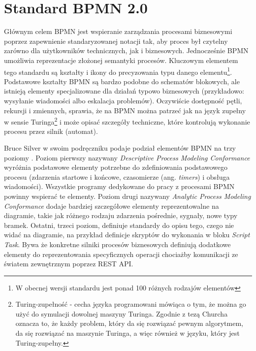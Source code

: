 \documentclass[declaration,shortabstract,mgr]{iithesis}
\newcommand{\bpmn}{BPMN }
\begin{document}
\chapter{Standard BPMN 2.0}\label{chapter-bpmn}
Głównym celem \bpmn jest wspieranie zarządzania procesami biznesowymi poprzez zapewnienie standaryzowanej notacji tak, aby proces był czytelny zarówno dla użytkowników technicznych, jak i biznesowych. Jednocześnie \bpmn umożliwia reprezentacje złożonej semantyki procesów. Kluczowym elementem tego standardu są kształty i ikony do precyzowania typu danego elementu\footnote{W obecnej wersji
standardu jest ponad 100 różnych rodzajów elementów}. Podstawowe kształty \bpmn są bardzo podobne do schematów blokowych, ale istnieją elementy specjalizowane dla działań typowo biznesowych (przykładowo: wysyłanie wiadomości albo eskalacja problemów). Oczywiście
dostępność pętli, rekursji i zmiennych, sprawia, że na \bpmn 
można patrzeć jak na język zupełny w sensie Turinga\footnote{Turing-zupełność - cecha języka programowani mówiąca o tym, że można go użyć do symulacji dowolnej maszyny Turinga. Zgodnie z tezą Churcha oznacza to, że każdy problem, który da się rozwiązać pewnym algorytmem, da się rozwiązać na maszynie Turinga, a więc również w języku, który jest Turing-zupełny.} i może opisać szczegóły techniczne, które kontrolują wykonanie procesu przez silnik (automat).  

Bruce Silver w swoim podręczniku podaje podział elementów \bpmn na trzy poziomy \cite{bruce-silver-bpmn-levels}. Poziom pierwszy nazywany \textit{Descriptive Process Modeling Conformance} wyróżnia podstawowe elementy potrzebne do zdefiniowania podstawowego procesu (zdarzenia startowe i końcowe, czasomierze (ang. \textit{timers}) i obsługa wiadomości). Wszystkie programy dedykowane do pracy z procesami \bpmn powinny wspierać te elementy. Poziom drugi nazywany \textit{Analytic Process Modeling Conformance} dodaje bardziej szczegółowe elementy reprezentowalne na diagramie, takie jak różnego rodzaju zdarzenia pośrednie, sygnały, nowe typy bramek. Ostatni, trzeci poziom, definiuje standardy do opisu tego, czego nie widać na diagramie, na przykład definicje skryptów do wykonania w bloku \textit{Script Task}. Bywa że konkretne silniki procesów biznesowych definiują dodatkowe elementy do reprezentowania specyficznych operacji chociażby komunikacji ze światem zewnętrznym poprzez REST API.
\end{document}
